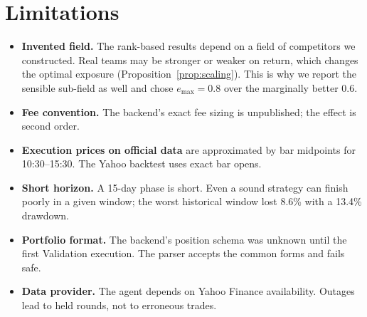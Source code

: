 \documentclass[11pt,a4paper]{article}
\begin{document}
\section{Limitations}
\begin{itemize}[nosep]
  \item \textbf{Invented field.} The rank-based results depend on a field of competitors we constructed. Real teams may
        be stronger or weaker on return, which changes the optimal exposure (Proposition~\ref{prop:scaling}). This is why
        we report the sensible sub-field as well and chose $e_{\max}=0.8$ over the marginally better 0.6.
  \item \textbf{Fee convention.} The backend's exact fee sizing is unpublished; the effect is second order.
  \item \textbf{Execution prices on official data} are approximated by bar midpoints for 10:30--15:30. The Yahoo
        backtest uses exact bar opens.
  \item \textbf{Short horizon.} A 15-day phase is short. Even a sound strategy can finish poorly in a given window; the
        worst historical window lost 8.6\% with a 13.4\% drawdown.
  \item \textbf{Portfolio format.} The backend's position schema was unknown until the first Validation execution. The
        parser accepts the common forms and fails safe.
  \item \textbf{Data provider.} The agent depends on Yahoo Finance availability. Outages lead to held rounds, not to
        erroneous trades.
\end{itemize}
\end{document}
